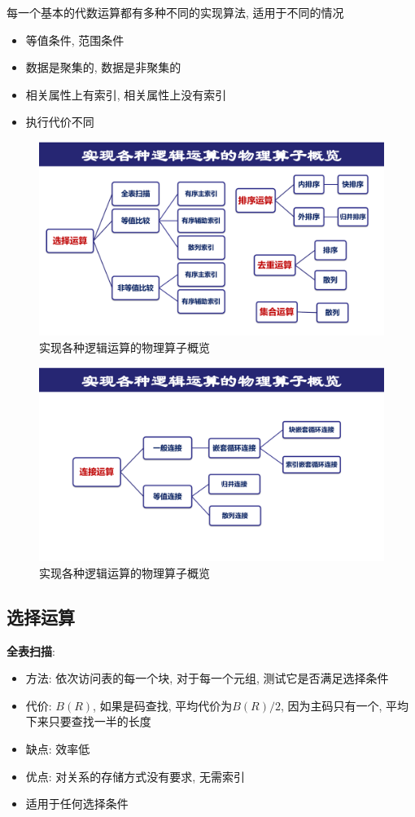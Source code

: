每一个基本的代数运算都有多种不同的实现算法, 适用于不同的情况
\begin{itemize}
    \item 等值条件, 范围条件
    \item 数据是聚集的, 数据是非聚集的
    \item 相关属性上有索引, 相关属性上没有索引
    \item 执行代价不同
\end{itemize}

\begin{figure}[H]
    \centering
    \includegraphics[width=.8\textwidth]{figure/物理算子-1.pdf}
    \caption{实现各种逻辑运算的物理算子概览}
\end{figure}

\begin{figure}[H]
    \centering
    \includegraphics[width=.7\textwidth]{figure/物理算子-2.pdf}
    \caption{实现各种逻辑运算的物理算子概览}
\end{figure}

\subsection{选择运算}

\textbf{全表扫描}:
\begin{itemize}
    \item 方法: 依次访问表的每一个块, 对于每一个元组, 测试它是否满足选择条件
    \item 代价: $B(R)$, 如果是码查找, 平均代价为$B(R)/2$, 因为主码只有一个, 平均下来只要查找一半的长度
    \item 缺点: 效率低
    \item 优点: 对关系的存储方式没有要求, 无需索引
    \item 适用于任何选择条件
\end{itemize}

